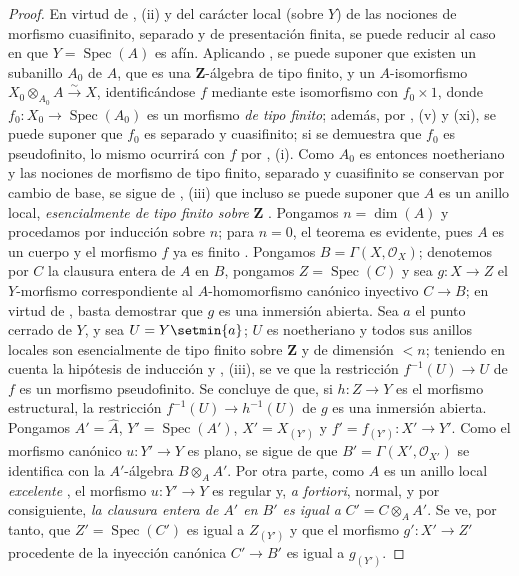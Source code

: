 \begin{proof}
En virtud de , (ii) y del carácter local (sobre $Y$) de las nociones de morfismo cuasifinito, separado y de presentación finita, se puede reducir al caso en que $Y=\operatorname{Spec}(A)$ es afín.
Aplicando , se puede suponer que existen un subanillo $A_0$ de $A$, que es una $\mathbf Z$-álgebra de tipo finito, y un $A$-isomorfismo $X_0\otimes_{A_0}A\xrightarrow{\sim}X$, identificándose $f$ mediante este isomorfismo con $f_0\times 1$, donde $f_0:X_0\to\operatorname{Spec}(A_0)$ es un morfismo \emph{de tipo finito}; además, por , (v) y (xi), se puede suponer que $f_0$ es separado y cuasifinito; si se demuestra que $f_0$ es pseudofinito, lo mismo ocurrirá con $f$ por , (i).
Como $A_0$ es entonces noetheriano y las nociones de morfismo de tipo finito, separado y cuasifinito se conservan por cambio de base, se sigue de , (iii) que incluso se puede suponer que $A$ es un anillo local, \emph{esencialmente de tipo finito sobre} $\mathbf Z$ .
Pongamos $n=\dim(A)$ y procedamos por inducción sobre $n$; para $n=0$, el teorema es evidente, pues $A$ es un cuerpo y el morfismo $f$ ya es finito .
Pongamos $B=\Gamma(X,\mathcal O_X)$; denotemos por $C$ la clausura entera de $A$ en $B$, pongamos $Z=\operatorname{Spec}(C)$ y sea $g:X\to Z$ el $Y$-morfismo correspondiente al $A$-homomorfismo canónico inyectivo $C\to B$; en virtud de , basta demostrar que $g$ es una inmersión abierta.
Sea $a$ el punto cerrado de $Y$, y sea $U=Y\setmin\{a\}$; $U$ es noetheriano y todos sus anillos locales son esencialmente de tipo finito sobre $\mathbf Z$ y de dimensión $<n$; teniendo en cuenta la hipótesis de inducción y , (iii), se ve que la restricción $f^{-1}(U)\to U$ de $f$ es un morfismo pseudofinito.
Se concluye de  que, si $h:Z\to Y$ es el morfismo estructural, la restricción $f^{-1}(U)\to h^{-1}(U)$ de $g$ es una inmersión abierta.
Pongamos $A'=\widehat A$, $Y'=\operatorname{Spec}(A')$, $X'=X_{(Y')}$ y $f'=f_{(Y')}:X'\to Y'$.
Como el morfismo canónico $u:Y'\to Y$ es plano, se sigue de  que $B'=\Gamma(X',\mathcal O_{X'})$ se identifica con la $A'$-álgebra $B\otimes_A A'$.
Por otra parte, como $A$ es un anillo local \emph{excelente} , el morfismo $u:Y'\to Y$ es regular y, \emph{a fortiori}, normal, y por consiguiente,  \emph{la clausura entera de $A'$ en $B'$ es igual a} $C'=C\otimes_A A'$.
Se ve, por tanto, que $Z'=\operatorname{Spec}(C')$ es igual a $Z_{(Y')}$ y que el morfismo $g':X'\to Z'$ procedente de la inyección canónica $C'\to B'$ es igual a $g_{(Y')}$.

\end{proof}
